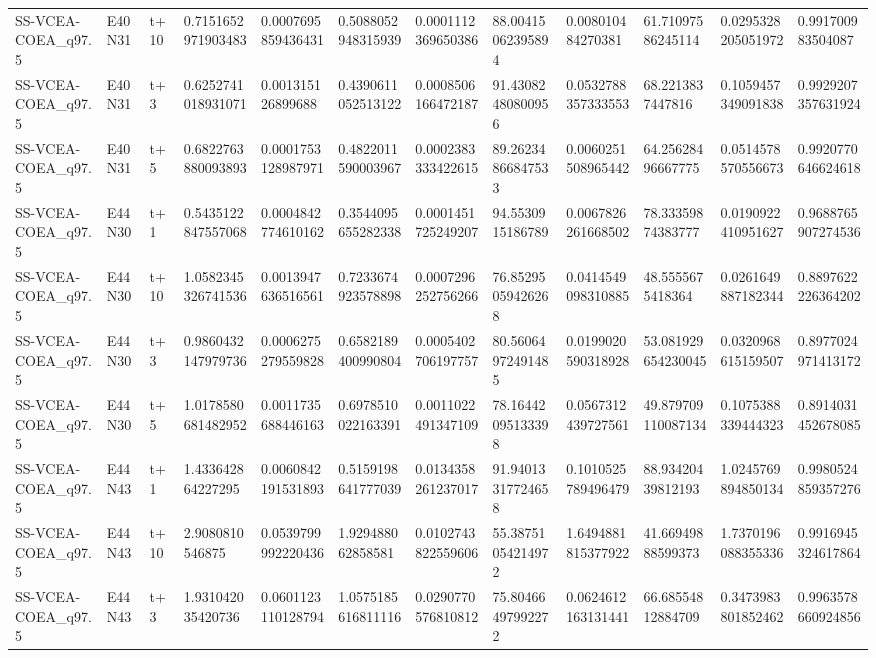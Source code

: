 \begin{landscape}
\begin{longtable}{llllllllllll}
SS-VCEA-COEA\_q97.5 & E40N31 & t+10 & 0.7151652971903483 & 0.0007695859436431 & 0.5088052948315939 & 0.0001112369650386 & 88.00415062395894 & 0.008010484270381 & 61.71097586245114 & 0.0295328205051972 & 0.991700983504087 \\
SS-VCEA-COEA\_q97.5 & E40N31 & t+3 & 0.6252741018931071 & 0.001315126899688 & 0.4390611052513122 & 0.0008506166472187 & 91.43082480800956 & 0.0532788357333553 & 68.2213837447816 & 0.1059457349091838 & 0.9929207357631924 \\
SS-VCEA-COEA\_q97.5 & E40N31 & t+5 & 0.6822763880093893 & 0.0001753128987971 & 0.4822011590003967 & 0.0002383333422615 & 89.26234866847533 & 0.0060251508965442 & 64.25628496667775 & 0.0514578570556673 & 0.9920770646624618 \\
SS-VCEA-COEA\_q97.5 & E44N30 & t+1 & 0.5435122847557068 & 0.0004842774610162 & 0.3544095655282338 & 0.0001451725249207 & 94.5530915186789 & 0.0067826261668502 & 78.33359874383777 & 0.0190922410951627 & 0.9688765907274536 \\
SS-VCEA-COEA\_q97.5 & E44N30 & t+10 & 1.0582345326741536 & 0.0013947636516561 & 0.7233674923578898 & 0.0007296252756266 & 76.85295059426268 & 0.0414549098310885 & 48.5555675418364 & 0.0261649887182344 & 0.8897622226364202 \\
SS-VCEA-COEA\_q97.5 & E44N30 & t+3 & 0.9860432147979736 & 0.0006275279559828 & 0.6582189400990804 & 0.0005402706197757 & 80.56064972491485 & 0.0199020590318928 & 53.081929654230045 & 0.0320968615159507 & 0.8977024971413172 \\
SS-VCEA-COEA\_q97.5 & E44N30 & t+5 & 1.0178580681482952 & 0.0011735688446163 & 0.6978510022163391 & 0.0011022491347109 & 78.16442095133398 & 0.0567312439727561 & 49.879709110087134 & 0.1075388339444323 & 0.8914031452678085 \\
SS-VCEA-COEA\_q97.5 & E44N43 & t+1 & 1.433642864227295 & 0.0060842191531893 & 0.5159198641777039 & 0.0134358261237017 & 91.94013317724658 & 0.1010525789496479 & 88.93420439812193 & 1.0245769894850134 & 0.9980524859357276 \\
SS-VCEA-COEA\_q97.5 & E44N43 & t+10 & 2.9080810546875 & 0.0539799992220436 & 1.929488062858581 & 0.0102743822559606 & 55.38751054214972 & 1.6494881815377922 & 41.66949888599373 & 1.7370196088355336 & 0.9916945324617864 \\
SS-VCEA-COEA\_q97.5 & E44N43 & t+3 & 1.931042035420736 & 0.0601123110128794 & 1.0575185616811116 & 0.0290770576810812 & 75.80466497992272 & 0.0624612163131441 & 66.68554812884709 & 0.3473983801852462 & 0.9963578660924856 \\

\end{longtable}
\end{landscape}
